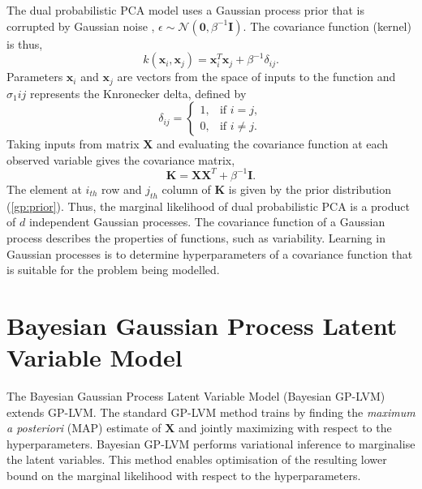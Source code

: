 \documentclass[ %
author={Dillon Keith Diep},
supervisor={Dr. Carl Henrik Ek},
degree={MEng},
title={ART-CG Hair:},
subtitle={Assisted Real-time Content Generation of Stylised Virtual Hair},
type={Research},
year={2017} ]{dissertation}
\begin{document}
	The dual probabilistic PCA model uses a Gaussian process prior that is corrupted by Gaussian noise \cite{gplvm}, $\epsilon\sim\mathcal{N}(\bm{0},\beta^{-1}\bm{I})$.
	The covariance function (kernel) is thus,
	\begin{equation} \label{gp:prior}
	k(\bm{x}_i,\bm{x}_j)=\bm{x}^T_i\bm{x}_j+\beta^{-1}\delta_{ij}.
	\end{equation}
	Parameters $\bm{x}_i$ and $\bm{x}_j$ are vectors from the space of inputs to the function and $\sigma_1{ij}$ represents the Knronecker delta, defined by 
	$$
	\delta_{ij} =
	\begin{cases}
	1, &         \text{if } i=j,\\
	0, &         \text{if } i\neq j.
	\end{cases}
	$$
	Taking inputs from matrix $\bm{X}$ and evaluating the covariance function at each observed variable gives the covariance matrix,
	$$\bm{K=XX}^T+\beta^{-1}\bm{I}.$$
	The element at $i_{th}$ row and $j_{th}$ column of $\bm{K}$ is given by the prior distribution (\ref{gp:prior}). Thus, the marginal likelihood of dual probabilistic PCA is a product of $d$ independent Gaussian processes. The covariance function of a Gaussian process describes the properties of functions, such as variability. Learning in Gaussian processes is to determine hyperparameters of a covariance function that is suitable for the problem being modelled.
	
	\section{Bayesian Gaussian Process Latent Variable Model}
	The Bayesian Gaussian Process Latent Variable Model (Bayesian GP-LVM) \cite{bgplvm} extends GP-LVM. The standard GP-LVM method trains by finding the \textit{maximum a posteriori} (MAP) estimate of $\bm{X}$ and jointly maximizing with respect to the hyperparameters. Bayesian GP-LVM performs variational inference to marginalise the latent variables. This method enables optimisation of the resulting lower bound on the marginal likelihood with respect to the hyperparameters. 
	
\end{document}
